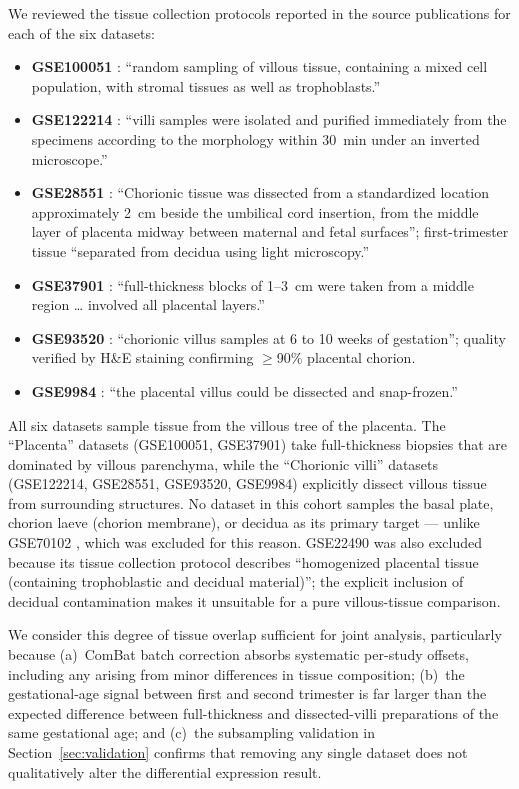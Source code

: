\documentclass[11pt,a4paper]{article}
\begin{document}
We reviewed the tissue collection protocols reported in the
source publications for each of the six datasets:

\begin{itemize}
  \item \textbf{GSE100051} \citep{Soncin2018}: ``random sampling
    of villous tissue, containing a mixed cell population, with
    stromal tissues as well as trophoblasts.''
  \item \textbf{GSE122214} \citep{Zhao2019}: ``villi samples
    were isolated and purified immediately from the specimens
    according to the morphology within 30~min under an inverted
    microscope.''
  \item \textbf{GSE28551} \citep{Sitras2012}: ``Chorionic tissue
    was dissected from a standardized location approximately 2~cm
    beside the umbilical cord insertion, from the middle layer of
    placenta midway between maternal and fetal surfaces'';
    first-trimester tissue ``separated from decidua using light
    microscopy.''
  \item \textbf{GSE37901} \citep{Uuskula2012}: ``full-thickness
    blocks of 1--3~cm were taken from a middle region \ldots{}
    involved all placental layers.''
  \item \textbf{GSE93520} \citep{Zhang2017}: ``chorionic villus
    samples at 6 to 10 weeks of gestation''; quality verified by
    H\&E staining confirming $\ge$90\% placental chorion.
  \item \textbf{GSE9984} \citep{Mikheev2008}: ``the placental
    villus could be dissected and snap-frozen.''
\end{itemize}

\noindent All six datasets sample tissue from the villous tree
of the placenta. The ``Placenta'' datasets (GSE100051,
GSE37901) take full-thickness biopsies that are dominated by
villous parenchyma, while the ``Chorionic villi'' datasets
(GSE122214, GSE28551, GSE93520, GSE9984) explicitly dissect
villous tissue from surrounding structures. No dataset in this
cohort samples the basal plate, chorion laeve (chorion membrane),
or decidua as its primary target --- unlike GSE70102
\citep{Bianco2016}, which was excluded for this reason.
GSE22490 \citep{Rull2013} was also excluded because its tissue
collection protocol describes ``homogenized placental tissue
(containing trophoblastic and decidual material)''; the
explicit inclusion of decidual contamination makes it unsuitable
for a pure villous-tissue comparison.

We consider this degree of tissue overlap sufficient for joint
analysis, particularly because (a)~ComBat batch correction
absorbs systematic per-study offsets, including any arising from
minor differences in tissue composition; (b)~the gestational-age
signal between first and second trimester is far larger than the
expected difference between full-thickness and dissected-villi
preparations of the same gestational age; and (c)~the subsampling
validation in Section~\ref{sec:validation} confirms that
removing any single dataset does not qualitatively alter the
differential expression result.
\end{document}

